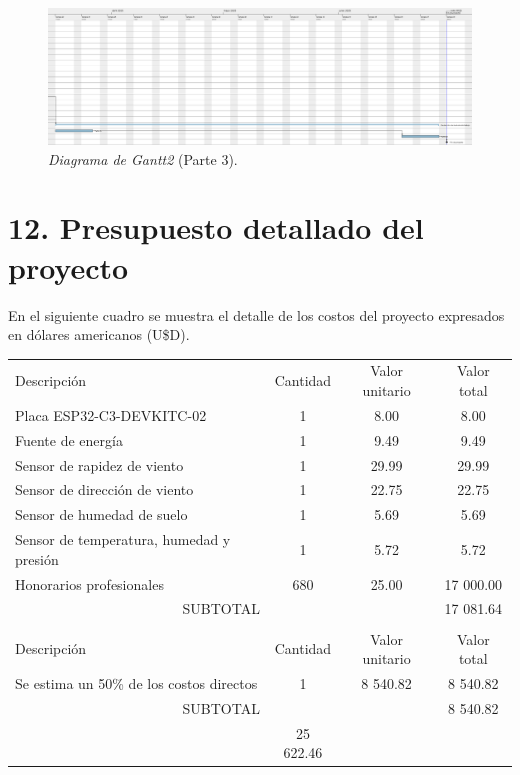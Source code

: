 \documentclass[
11pt, %
codirector, %
]{charter}
\begin{document}
\begin{landscape}
\begin{figure}[htpb]
\centering 
\includegraphics[width=1.55\textwidth, height=1\textheight]{./Figuras/Gantt (2).png}
\caption{\textit{Diagrama de Gantt2} (Parte 3).} %
\label{fig:diagGantt}
\end{figure}
\end{landscape}


\section{12. Presupuesto detallado del proyecto}
\label{sec:presupuesto}

En el siguiente cuadro se muestra el detalle de los costos del proyecto expresados en dólares
americanos (U\$D).

\begin{table}[htpb]
\centering
\begin{tabularx}{\linewidth}{@{}|X|c|c|c|@{}}
\hline
\rowcolor[HTML]{C0C0C0} 
\multicolumn{4}{|c|}{\cellcolor[HTML]{C0C0C0}COSTOS DIRECTOS} \\ \hline
\rowcolor[HTML]{C0C0C0} 
Descripción &
  \cellcolor[HTML]{C0C0C0}Cantidad &
  \cellcolor[HTML]{C0C0C0}Valor unitario &
  \cellcolor[HTML]{C0C0C0}Valor total \\ \hline
Placa ESP32-C3-DEVKITC-02 & 1 & 8.00 & 8.00 \\ \hline
Fuente de energía & 1 & 9.49 & 9.49 \\ \hline
Sensor de rapidez de viento & 1 & 29.99 & 29.99 \\ \hline
Sensor de dirección de viento & 1 & 22.75 & 22.75 \\ \hline
Sensor de humedad de suelo & 1 & 5.69 & 5.69 \\ \hline
Sensor de temperatura, humedad y presión & 1 & 5.72 & 5.72 \\ \hline
Honorarios profesionales & 680 & 25.00 & 17 000.00 \\ \hline
\multicolumn{3}{|c|}{SUBTOTAL} & 17 081.64 \\ \hline
\rowcolor[HTML]{C0C0C0} 
\multicolumn{4}{|c|}{\cellcolor[HTML]{C0C0C0}COSTOS INDIRECTOS} \\ \hline
\rowcolor[HTML]{C0C0C0} 
Descripción & Cantidad & Valor unitario & Valor total \\ \hline
Se estima un 50\% de los costos directos & 1 & 8 540.82 & 8 540.82 \\ \hline
\multicolumn{3}{|c|}{SUBTOTAL} & 8 540.82 \\ \hline
\rowcolor[HTML]{C0C0C0}
\multicolumn{3}{|c|}{TOTAL} & 25 622.46 \\ \hline
\end{tabularx}
\end{table}
\end{document}
